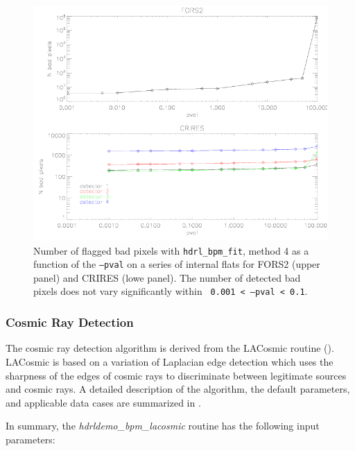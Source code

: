 \begin{figure}
 \subfigure
\includegraphics[width=15cm]{figures/results_bpmfit_real.png}
 \caption{Number of flagged bad pixels with {\tt hdrl\_bpm\_fit},
   method 4 as a function of the {\tt --pval} on a series of internal
   flats for FORS2 (upper panel) and CRIRES (lowe panel). The number
   of detected bad pixels does not vary significantly within {\tt
     0.001 < --pval < 0.1}.}
 \label{fig:sequence_m4_real}
\end{figure}


\subsubsection{Cosmic Ray Detection}


The cosmic ray detection algorithm is derived from the LACosmic routine (\cite{vanDokkum2001}).
LACosmic is based on a variation of Laplacian edge detection which uses the sharpness of the
edges of cosmic rays to discriminate between legitimate sources and cosmic rays.   A detailed
description of the algorithm, the default parameters, and applicable data cases
are summarized in \cite{vanDokkum2001}.

In summary, the {\em hdrldemo\_bpm\_lacosmic} routine has the following input parameters:\\

